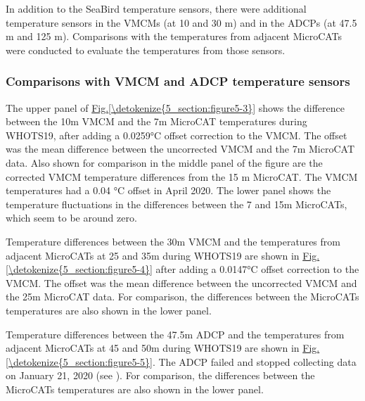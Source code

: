 \documentclass[a4paper,10pt,english,openany,oneside]{sphinxmanual}
\begin{document}
\sphinxAtStartPar
In addition to the Sea\sphinxhyphen{}Bird temperature sensors, there were additional
temperature sensors in the VMCMs (at 10 and 30 m) and in the ADCPs (at 47.5 m
and 125 m). Comparisons with the temperatures from adjacent MicroCATs were
conducted to evaluate the temperatures from those sensors.


\subsubsection{Comparisons with VMCM and ADCP temperature sensors}
\label{\detokenize{5_section:comparisons-with-vmcm-and-adcp-temperature-sensors}}
\sphinxAtStartPar
The upper panel of \hyperref[\detokenize{5_section:figure5-3}]{Fig.\@ \ref{\detokenize{5_section:figure5-3}}} shows the difference between the 10\sphinxhyphen{}m
VMCM and the 7\sphinxhyphen{}m MicroCAT temperatures during WHOTS\sphinxhyphen{}19, after adding a 0.0259°C
offset correction to the VMCM. The offset was the mean difference between
the uncorrected VMCM and the 7\sphinxhyphen{}m MicroCAT data. Also shown for comparison in
the middle panel of the figure are the corrected VMCM temperature differences
from the 15 m MicroCAT. The VMCM temperatures had a 0.04 °C offset in April
2020. The lower panel shows the temperature fluctuations in the differences
between the 7 and 15\sphinxhyphen{}m MicroCATs, which seem to be around zero.

\sphinxAtStartPar
Temperature differences between the 30\sphinxhyphen{}m VMCM and the temperatures from
adjacent MicroCATs at 25 and 35\sphinxhyphen{}m during WHOTS\sphinxhyphen{}19 are shown in
\hyperref[\detokenize{5_section:figure5-4}]{Fig.\@ \ref{\detokenize{5_section:figure5-4}}} after adding a 0.0147°C offset correction to the VMCM. The
offset was the mean difference between the uncorrected VMCM and the 25\sphinxhyphen{}m
MicroCAT data. For comparison, the differences between the MicroCATs
temperatures are also shown in the lower panel.

\sphinxAtStartPar
Temperature differences between the 47.5\sphinxhyphen{}m ADCP and the temperatures from
adjacent MicroCATs at 45 and 50\sphinxhyphen{}m during WHOTS\sphinxhyphen{}19 are shown in
\hyperref[\detokenize{5_section:figure5-5}]{Fig.\@ \ref{\detokenize{5_section:figure5-5}}}. The ADCP failed and stopped collecting data on January
21, 2020 (see {\hyperref[\detokenize{3_section:description-of-whots-19-mooring}]{}}). For
comparison, the differences between the MicroCATs temperatures are also
shown in the lower panel.
\end{document}
